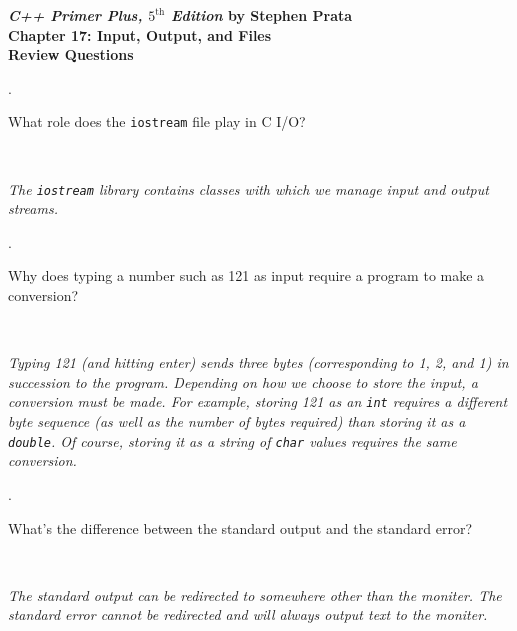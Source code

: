 \documentclass{amsart}
\newcommand{\ttt}[1]{\texttt{#1}}
\begin{document}
\begin{center}
	\Large {\bfseries
	\emph{C++ Primer Plus, $5^{\text{th}}$ Edition} by Stephen Prata \\
	Chapter 17: Input, Output, and Files \\
	Review Questions} \normalsize \vspace{5ex}
\end{center}


\phantom{\quad} 
\vfill
{}. 
\begin{minipage}[t]{11.5 cm}
	What role does the \texttt{iostream} file play in C\raisebox{.15ex}{++} I/O?
\end{minipage} \\[1ex]
\phantom{3. } 
\begin{minipage}[t]{11.5 cm}
	{\slshape 
		The \ttt{iostream} library contains classes with which we
		manage input and output streams.
	} 
\end{minipage} 
\vfill

. 
\begin{minipage}[t]{11.5 cm}
	Why does typing a number such as 121 as input require a program to make a conversion?
\end{minipage} \\[1ex]
\phantom{2. } 
\begin{minipage}[t]{11.5 cm}
	{\slshape 
		Typing 121 (and hitting enter) sends three bytes
		(corresponding to 1, 2, and 1) in succession to the program. 
		Depending on how we choose to store the input, a conversion 
		must be made.
		For example, storing 121 as an \ttt{int} requires a different
		byte sequence (as well as the number of bytes required) than
		storing it as a \ttt{double}.
		Of course, storing it as a string of \ttt{char} values
		requires the same conversion.
	} 
\end{minipage} 
\vfill

. 
\begin{minipage}[t]{11.5 cm}
	What's the difference between the standard output and the standard error?
\end{minipage} \\[1ex]
\phantom{3. } 
\begin{minipage}[t]{11.5 cm}
	{\slshape 
		The standard output can be redirected to somewhere other
		than the moniter. 
		The standard error cannot be redirected and will always
		output text to the moniter. 
	} 
\end{minipage} 
\vfill
\end{document}
